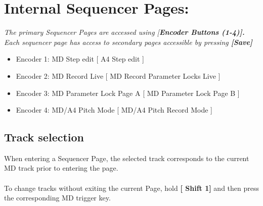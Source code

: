 \chapter{Internal Sequencer Pages:}
\textit{The primary Sequencer Pages are accessed using [\textbf{Encoder Buttons (1-4)].} Each sequencer page has access to secondary pages accessible by pressing \textbf{[Save]}}
\begin{itemize}
	\item Encoder 1: MD Step edit                          [ A4 Step edit ]
	\item Encoder 2: MD Record Live                      [ MD Record Parameter Locks Live ]
	\item Encoder 3: MD Parameter Lock Page A  [ MD Parameter Lock Page B ]
	\item Encoder 4: MD/A4 Pitch Mode                [ MD/A4 Pitch Record Mode ]
\end{itemize}
\section{Track selection}
When entering a Sequencer Page, the selected track corresponds to the current MD track prior to entering the page.\\
\\
To change tracks without exiting the current Page, hold \textbf{[ Shift 1]}
and then press the corresponding MD trigger key.

